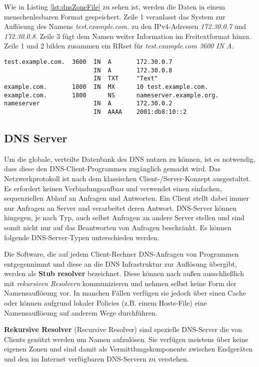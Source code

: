 Wie in Listing \ref{lst:dnsZoneFile} zu sehen ist, werden die Daten in einem menschenlesbaren Format gespeichert. Zeile 1 veranlasst das System zur Auflösung des Namens \textit{test.example.com.} zu den IPv4-Adressen \textit{172.30.0.7} und \textit{172.30.0.8}. Zeile 3 fügt dem Namen weiter Information im Freitextformat hinzu. Zeile 1 und 2 bilden zusammen ein RRset für \textit{test.example.com 3600 IN A}.

\begin{lstlisting}[caption={Ausschnitt aus dem Zone-File \textit{example.com}}, label={lst:dnsZoneFile}]
test.example.com.  3600  IN  A       172.30.0.7
                         IN  A       172.30.0.8
                         IN  TXT     "Text"
example.com.       1800  IN  MX      10 test.example.com.
example.com.       1800      NS      nameserver.example.org.
nameserver               IN  A       172.30.0.2
                         IN  AAAA    2001:db8:10::2
\end{lstlisting}

\subsection{DNS Server}

Um die globale, verteilte Datenbank des DNS nutzen zu können, ist es notwendig, dass diese den DNS-Client-Programmen zugänglich gemacht wird. Das Netzwerkprotokoll ist nach dem klassischen Client-/Server-Konzept ausgestaltet. Es erfordert keinen Verbindungsaufbau und verwendet einen einfachen, sequenziellen Ablauf an Anfragen und Antworten. Ein Client stellt dabei immer nur Anfragen an Server und verarbeitet deren Antwort. DNS-Server können hingegen, je nach Typ, auch selbst Anfragen an andere Server stellen und sind somit nicht nur auf das Beantworten von Anfragen beschränkt. Es können folgende DNS-Server-Typen unterschieden werden.

Die Software, die auf jedem Client-Rechner DNS-Anfragen von Programmen entgegennimmt und diese an die DNS Infrastruktur zur Auflösung übergibt, werden als \textbf{Stub resolver} bezeichnet. Diese können nach außen ausschließlich mit \textit{rekursiven Resolvern} kommunizieren und nehmen selbst keine Form der Namensauflösung vor. In manchen Fällen verfügen sie jedoch über einen Cache oder können aufgrund lokaler Policies (z.B. einem Hosts-File) eine Namensauflösung auf anderem Wege durchführen.

\textbf{Rekursive Resolver} (Recursive Resolver) sind spezielle DNS-Server die von Clients genützt werden um Namen aufzulösen. Sie verfügen meistens über keine eigenen Zonen und sind damit als Vermittlungskomponente zwischen Endgeräten und den im Internet verfügbaren DNS-Servern zu verstehen.

